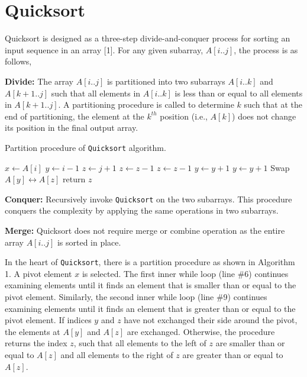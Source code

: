 \documentclass[a4paper, 10pt,twocolumn]{article}
\begin{document}
\section{Quicksort}
Quicksort is designed as a three-step divide-and-conquer process for sorting an input sequence in an array [1]. For any given subarray, $A[i..j]$, the process is as follows,
\par
\noindent
\textbf{Divide:} The array $A[i..j]$ is partitioned into two subarrays $A[i..k]$ and $A[k + 1..j]$ such that all elements in $A[i..k]$ is less than or equal to all elements in $A[k + 1..j]$. A partitioning procedure is called to determine $k$ such that at the end of partitioning, the element at the $k^{th}$ position (i.e., $A[k]$) does not change its position in the final output array.
\begin{algorithm}
	\caption{Partition procedure of \texttt{Quicksort} algorithm.}
	\label{algo:quick_sort1}
	\begin{algorithmic}[1]
		\newline
     	\newline
      		\State $x \leftarrow A[i]$
      		\State $y \leftarrow i-1$
      		\State $z \leftarrow j+1$ 
          		\State $z \leftarrow z-1$ 
            		\State $z \leftarrow z-1$  
          		\EndWhile
      	  		\State $y \leftarrow y+1$
            		\State $y \leftarrow y+1$  
          		\EndWhile
          			\State Swap $A[y] \leftrightarrow A[z]$
          		\Else
          			\State return $z$ 
          		\EndIf
      		\EndWhile
     	\EndProcedure 
  	\end{algorithmic}
\end{algorithm}
\par
\noindent
\textbf{Conquer:} Recursively invoke \texttt{Quicksort} on the two subarrays. This procedure conquers the complexity by applying the same operations in two subarrays.
\par
\noindent
\textbf{Merge:} Quicksort does not require merge or combine operation as the entire array $A[i..j]$ is sorted in place.
\par
In the heart of \texttt{Quicksort}, there is a partition procedure as shown in Algorithm 1. A pivot element $x$ is selected. The first inner while loop (line \#6) continues examining elements until it finds an element that is smaller than or equal to the pivot element. Similarly, the second inner while loop (line \#9) continues examining elements until it finds an element that is greater than or equal to the pivot element. If indices $y$ and $z$ have not exchanged their side around the pivot, the elements at $A[y]$ and $A[z]$ are exchanged. Otherwise, the procedure returns the index $z$, such that all elements to the left of $z$ are smaller than or equal to $A[z]$ and all elements to the right of $z$ are greater than or equal to $A[z]$.
\end{document}
